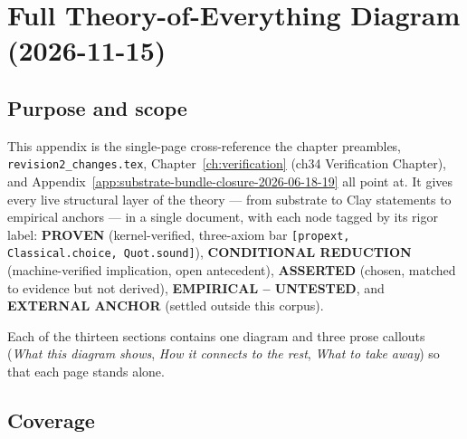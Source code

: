 %
%

\chapter{Full Theory-of-Everything Diagram (2026-11-15)}
\label{app:toe-diagram-2026-11-15}

\section*{Purpose and scope}

This appendix is the single-page cross-reference the chapter preambles,
\texttt{revision2\_changes.tex}, Chapter~\ref{ch:verification}
(ch34 Verification Chapter), and Appendix~\ref{app:substrate-bundle-closure-2026-06-18-19}
all point at.  It gives every live structural layer of the theory --- from
substrate to Clay statements to empirical anchors --- in a single document,
with each node tagged by its rigor label:
\textbf{PROVEN} (kernel-verified, three-axiom bar
\texttt{[propext, Classical.choice, Quot.sound]}),
\textbf{CONDITIONAL REDUCTION} (machine-verified implication, open antecedent),
\textbf{ASSERTED} (chosen, matched to evidence but not derived),
\textbf{EMPIRICAL -- UNTESTED}, and
\textbf{EXTERNAL ANCHOR} (settled outside this corpus).

Each of the thirteen sections contains one diagram and three prose
callouts (\emph{What this diagram shows}, \emph{How it connects to the
rest}, \emph{What to take away}) so that each page stands alone.

\section*{Coverage}

